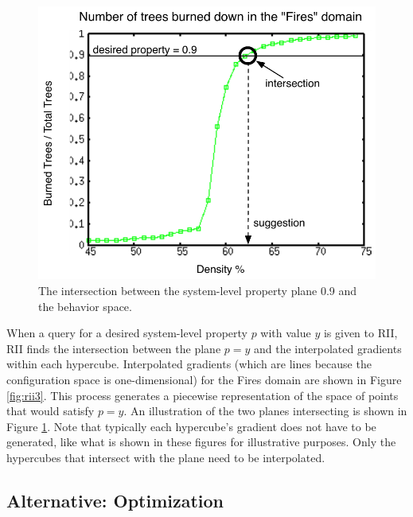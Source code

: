 \begin{figure}[ht]
\centering
\includegraphics[scale=.66666667]{images/rii5.pdf}
\caption{The intersection between the system-level property plane 0.9 and the behavior space.}
\label{fig:rii5}
\end{figure}

When a query for a desired system-level property $p$ with value $y$ is given to RII, RII finds the intersection between the plane $p = y$ and the interpolated gradients within each hypercube.
Interpolated gradients (which are lines because the configuration space is one-dimensional) for the Fires domain are shown in Figure \ref{fig:rii3}.
This process generates a piecewise representation of the space of points that would satisfy $p=y$.
An illustration of the two planes intersecting is shown in Figure \ref{fig:rii5}.
Note that typically each hypercube's gradient does not have to be generated, like what is shown in these figures for illustrative purposes.
Only the hypercubes that intersect with the plane need to be interpolated.










\subsection{Alternative: Optimization}

